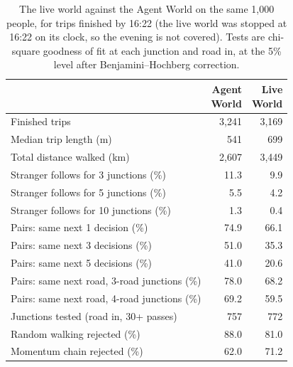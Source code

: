 
\begin{table}[t]
\centering
\footnotesize
\setlength{\tabcolsep}{4pt}
\caption{The live world against the Agent World on the same 1{,}000 people, for trips finished by 16:22 (the live world was stopped at 16:22 on its clock, so the evening is not covered). Tests are chi-square goodness of fit at each junction and road in, at the 5\% level after Benjamini--Hochberg correction.}
\label{tab:live-summary}
\begin{tabular}{@{}lrr@{}}
\toprule
 & \shortstack{Agent\\World} & \shortstack{Live\\World} \\
\midrule
Finished trips & 3{,}241 & 3{,}169 \\
Median trip length (m) & 541 & 699 \\
Total distance walked (km) & 2{,}607 & 3{,}449 \\
Stranger follows for 3 junctions (\%) & 11.3 & 9.9 \\
Stranger follows for 5 junctions (\%) & 5.5 & 4.2 \\
Stranger follows for 10 junctions (\%) & 1.3 & 0.4 \\
Pairs: same next 1 decision (\%) & 74.9 & 66.1 \\
Pairs: same next 3 decisions (\%) & 51.0 & 35.3 \\
Pairs: same next 5 decisions (\%) & 41.0 & 20.6 \\
Pairs: same next road, 3-road junctions (\%) & 78.0 & 68.2 \\
Pairs: same next road, 4-road junctions (\%) & 69.2 & 59.5 \\
Junctions tested (road in, 30+ passes) & 757 & 772 \\
Random walking rejected (\%) & 88.0 & 81.0 \\
Momentum chain rejected (\%) & 62.0 & 71.2 \\
\bottomrule
\end{tabular}
\end{table}


